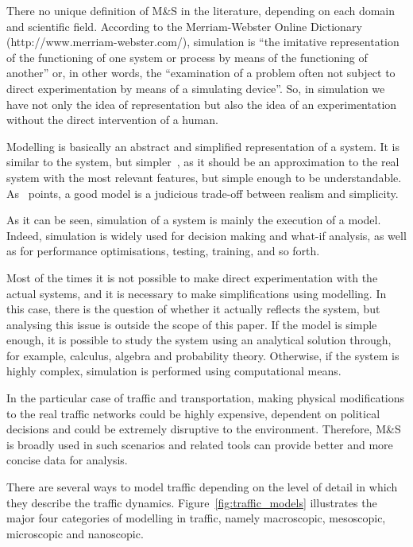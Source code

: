 \documentclass[conference]{IEEEtran}
\begin{document}
There no unique definition of M\&S in the literature, depending on each domain and scientific field. According to the Merriam-Webster Online Dictionary (http://www.merriam-webster.com/), simulation is ``the imitative representation of the functioning of one system or process by means of the functioning of another'' or, in other words, the ``examination of a problem often not subject to direct experimentation by means of a simulating device''. So, in simulation we have not only the idea of representation but also the idea of an experimentation without the direct intervention of a human.

Modelling is basically an abstract and simplified representation of a system. It is similar to the system, but simpler~\cite{robinson2008conceptual}, as it should be an approximation to the real system with the most relevant features, but simple enough to be understandable. As~\cite{sargent2005verification} points, a good model is a judicious trade-off between realism and simplicity.

As it can be seen, simulation of a system is mainly the execution of a model. Indeed, simulation is widely used for decision making and what-if analysis, as well as for performance optimisations, testing, training, and so forth.

Most of the times it is not possible to make direct experimentation with the actual systems, and it is necessary to make simplifications using modelling. In this case, there is the question of whether it actually reflects the system, but analysing this issue is outside the scope of this paper. If the model is simple enough, it is possible to study the system using an analytical solution through, for example, calculus, algebra and probability theory. Otherwise, if the system is highly complex, simulation is performed using computational means. 

In the particular case of traffic and transportation, making physical modifications to the real traffic networks could be highly expensive, dependent on political decisions and could be extremely disruptive to the environment. Therefore, M\&S is broadly used in such scenarios and related tools can provide better and more concise data for analysis.

There are several ways to model traffic depending on the level of detail in which they describe the traffic dynamics. Figure~\ref{fig:traffic_models} illustrates the major four categories of modelling in traffic, namely macroscopic, mesoscopic, microscopic and nanoscopic.
\end{document}
